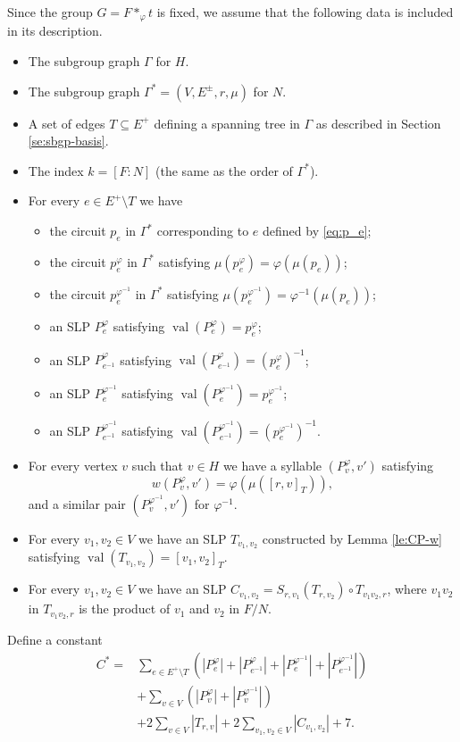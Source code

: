 \documentclass[12pt,oneside]{amsart}
\theoremstyle{definition}
\theoremstyle{case}
\DeclareMathOperator{\val}{val}
\begin{document}
Since the group $G=F\ast_\varphi t$ is fixed,
we assume that the following data is included in its description.
\begin{itemize}
\item 
The subgroup graph $\Gamma$ for $H$.
\item 
The subgroup graph $\Gamma^\ast=(V,E^\pm,r,\mu)$ for $N$.
\item 
A set of edges $T\subseteq E^+$ defining a
spanning tree in $\Gamma$ as described in Section \ref{se:sbgp-basis}.
\item 
The index $k=[F:N]$ (the same as the order of $\Gamma^\ast$).
\item 
For every $e\in E^+\setminus T$ we have
\begin{itemize}
\item 
the circuit $p_e$ in $\Gamma^\ast$ corresponding to $e$ defined by \eqref{eq:p_e};
\item 
the circuit $p_e^\varphi$ in $\Gamma^\ast$ satisfying 
$\mu(p_e^\varphi) = \varphi(\mu(p_e))$;
\item 
the circuit $p_e^{\varphi^{-1}}$ in $\Gamma^\ast$ satisfying
$\mu(p_e^{\varphi^{-1}}) = \varphi^{-1}(\mu(p_e))$;
\item 
an SLP $P_e^\varphi$ satisfying
$\val(P_e^\varphi) = p_e^\varphi$;
\item 
an SLP $P_{e^{-1}}^\varphi$ satisfying
$\val(P_{e^{-1}}^\varphi) = (p_e^\varphi)^{-1}$;
\item 
an SLP $P_e^{\varphi^{-1}}$ satisfying
$\val(P_e^{\varphi^{-1}}) = p_e^{\varphi^{-1}}$;
\item 
an SLP $P_{e^{-1}}^{\varphi^{-1}}$ satisfying
$\val(P_{e^{-1}}^{\varphi^{-1}}) = (p_e^{\varphi^{-1}})^{-1}$.
\end{itemize}
\item 
For every vertex $v$ such that $v\in H$ we have 
a syllable $(P_v^\varphi,v')$ satisfying
$$
w(P_v^\varphi,v') = \varphi(\mu([r,v]_T)),
$$
and a similar pair $(P_v^{\varphi^{-1}},v')$ for $\varphi^{-1}$.
\item
For every $v_1,v_2\in V$ we have an SLP $T_{v_1,v_2}$ constructed
by Lemma \ref{le:CP-w} satisfying 
$\val(T_{v_1,v_2}) = [v_1,v_2]_T$.
\item 
For every $v_1,v_2\in V$ we have an SLP
$C_{v_1,v_2} = S_{r,v_1}(T_{r,v_2}) \circ T_{v_1v_2,r}$, where
$v_1v_2$ in $T_{v_1v_2,r}$ is the product of $v_1$ and $v_2$ in $F/N$.
\end{itemize}
Define a constant 
\begin{align*}
C^\ast = &
\sum_{e\in E^+\setminus T}
(|P_e^\varphi|+
|P_{e^{-1}}^\varphi|+
|P_e^{\varphi^{-1}}|+
|P_{e^{-1}}^{\varphi^{-1}}|) \\
&+\sum_{v\in V} (|P_v^\varphi|+|P_v^{\varphi^{-1}}|) \\
&+2\sum_{v\in V} |T_{r,v}| + 2\sum_{v_1,v_2\in V} |C_{v_1,v_2}| + 7.
\end{align*}
\end{document}
